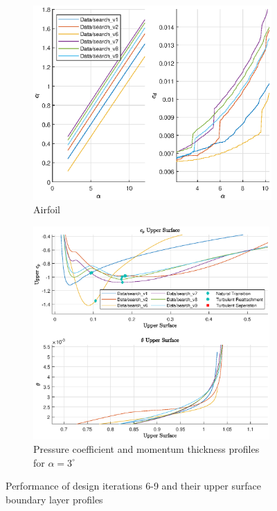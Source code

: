 \documentclass{article}
\begin{document}
\begin{figure}[H]
    \centering
    \begin{subfigure}{0.45\textwidth}
        \centering
        \includegraphics[width=1.2\textwidth, center]{figures/hiRe_lad_9.eps}
        \caption{Airfoil}
        \label{fig:v9_lad}
    \end{subfigure}
    \begin{subfigure}{0.54\textwidth}
        \centering
        \includegraphics[width=0.99\textwidth]{figures/hiRe_upperprofile_9_a3.eps}
        \caption{Pressure coefficient and momentum thickness profiles for $\alpha = 3^\circ$}
        \label{fig:v9_uprofile}
    \end{subfigure}
    \caption{Performance of design iterations 6-9 and their upper surface boundary layer profiles}
\end{figure}
\end{document}

